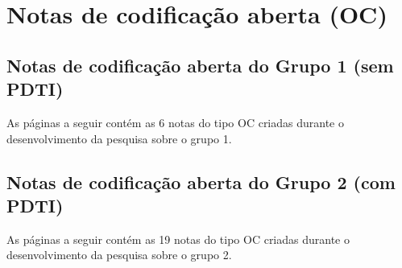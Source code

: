 \chapter{Notas de codificação aberta (OC)} %
\label{apendice:h_notas_oc}
\section{Notas de codificação aberta do Grupo 1 (sem PDTI)}
As páginas a seguir contém as 6 notas do tipo OC criadas durante o desenvolvimento da pesquisa sobre o grupo 1.



\section{Notas de codificação aberta do Grupo 2 (com PDTI)}
As páginas a seguir contém as 19 notas do tipo OC criadas durante o desenvolvimento da pesquisa sobre o grupo 2.

